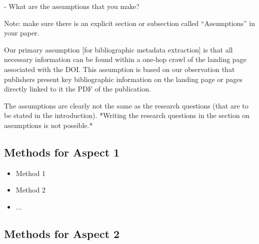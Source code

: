 \documentclass[manuscript, nonacm]{acmart}
\begin{document}
- What are the assumptions that you make?

Note: make sure there is an explicit section or subsection called ``Assumptions'' in your paper.

\begin{tcolorbox}
[title=Example: A textbook example of what an assumption is]
Our primary assumption [for bibliographic metadata extraction] is that all necessary information can be found within a one-hop crawl of the landing page associated with the DOI. This assumption is based on our observation that publishers present key bibliographic information on the landing page or pages directly linked to it \eg the PDF of the publication.
\end{tcolorbox}


\begin{tcolorbox}
[title=Assumptions: Difference to research questions.]
The assumptions are clearly not the same as the research questions (that are to be stated in the introduction). *Writing the research questions in the section on assumptions is not possible.* 
\end{tcolorbox}



\subsection{Methods for Aspect 1}


\begin{itemize}
    \item Method 1
    \item Method 2
    \item ...
\end{itemize}

\subsection{Methods for Aspect 2}
\end{document}
